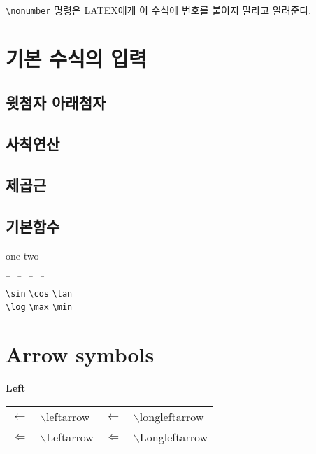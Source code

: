 	\verb|\nonumber| 명령은 LATEX에게 이 수식에 번호를 붙이지 말라고 알려준다.
	


%
%
%
\clearpage
\section{기본 수식의 입력}

	\subsection{윗첨자 아래첨자}

	\subsection{사칙연산}

	\subsection{제곱근}
	
	\subsection{기본함수}
	
	one \hfill two\\
	
	
		\begin{tabbing}
		~\hspace{3cm}\= ~\hspace{3cm} \= ~\hspace{3cm} \= ~\hspace{3cm} \= \kill \\
		\verb|\sin| \> \verb|\cos| \> \verb|\tan| \> \\
		\verb|\log| \> \verb|\max| \> \verb|\min| \>
		\end{tabbing}
	
	


%
%
%
\clearpage
\section{Arrow symbols}

			\textbf{Left}\\
			\begin{tabular}{ p{} p{} 
							p{} p{}  }
			\toprule
			$\leftarrow$		&$\backslash$leftarrow &
			$\longleftarrow$	&$\backslash$longleftarrow \\
			$\Leftarrow$		&$\backslash$Leftarrow&
			$\Longleftarrow$	&$\backslash$Longleftarrow \\
			\bottomrule
			\end{tabular} \\
			
